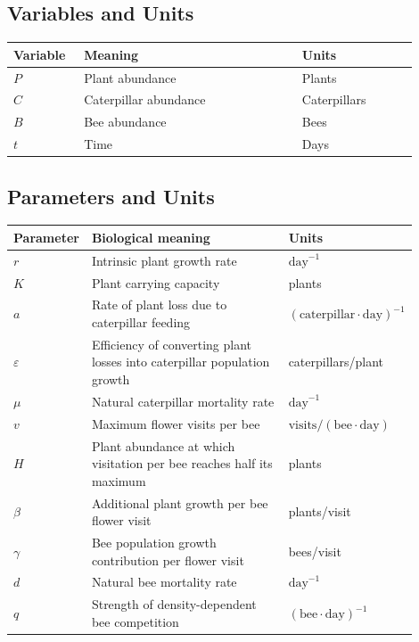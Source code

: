 \documentclass[11pt]{article}
\begin{document}
\subsection{Variables and Units}
\begin{center}
    \begin{tabular}{@{}p{0.15\linewidth}p{0.49\linewidth}p{0.26\linewidth}@{}}
        \hline
        Variable & Meaning & Units \\
        \hline
        $P$ & Plant abundance & Plants \\
        $C$ & Caterpillar abundance & Caterpillars \\
        $B$ & Bee abundance & Bees \\
        $t$ & Time & Days \\
        \hline
    \end{tabular}
\end{center}

\subsection{Parameters and Units}
\begin{center}
    \renewcommand{\arraystretch}{1.4}
    \begin{tabular}{@{}p{0.15\linewidth}p{0.49\linewidth}p{0.26\linewidth}@{}}
        \hline
        Parameter & Biological meaning & Units \\
        \hline
        $r$ & Intrinsic plant growth rate & $\mathrm{day}^{-1}$ \\
        $K$ & Plant carrying capacity & plants \\
        $a$ & Rate of plant loss due to caterpillar feeding & $(\mathrm{caterpillar}\cdot\mathrm{day})^{-1}$ \\
        $\varepsilon$ & Efficiency of converting plant losses into caterpillar
        population growth & caterpillars/plant \\
        $\mu$ & Natural caterpillar mortality rate & $\mathrm{day}^{-1}$ \\
        $v$ & Maximum flower visits per bee & $\mathrm{visits}/(\mathrm{bee}\cdot\mathrm{day})$ \\
        $H$ & Plant abundance at which visitation per bee reaches half its
        maximum & plants \\
        $\beta$ & Additional plant growth per bee flower visit & plants/visit \\
        $\gamma$ & Bee population growth contribution per flower visit & bees/visit \\
        $d$ & Natural bee mortality rate & $\mathrm{day}^{-1}$ \\
        $q$ & Strength of density-dependent bee competition & $(\mathrm{bee}\cdot\mathrm{day})^{-1}$ \\
        \hline
    \end{tabular}
\end{center}
\end{document}
